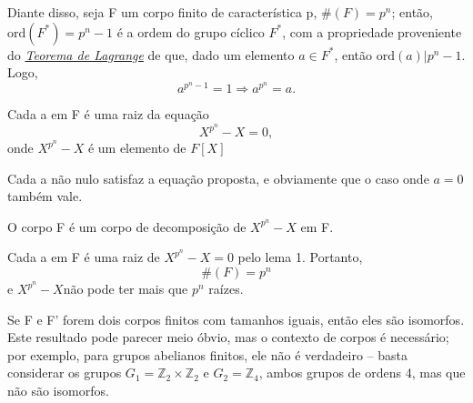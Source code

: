 \documentclass[../algebraIII_notes.tex]{subfiles}
\begin{document}
Diante disso, seja F um corpo finito de característica p, \(\# (F)=p^{n}\); então, \(\mathrm{ord}(F^{*})=p^{n}-1\) é a ordem do grupo cíclico \(F^{*}\), com a propriedade proveniente do \hyperlink{lagrange_theorem}{\textit{Teorema de Lagrange}} de que, dado um elemento \(a\in F^{*}\), então \(\mathrm{ord}(a)| p^{n}-1\). Logo,
\[
	a^{p^{n}-1}=1 \Rightarrow a^{p^{n}}=a.
\]
\begin{lemma*}
	Cada a em F é uma raiz da equação
	\[
		X^{p^{n}}-X =0,
	\]
	onde \(X^{p^{n}}-X\) é um elemento de \(F[X]\)
\end{lemma*}
\begin{proof*}
	Cada a não nulo satisfaz a equação proposta, e obviamente que o caso onde \(a=0\) também vale. \qedsymbol
\end{proof*}
\begin{crl*}
	O corpo F é um corpo de decomposição de \(X^{p^{n}}-X\) em F.
\end{crl*}
\begin{proof*}
	Cada a em F é uma raiz de \(X^{p^{n}}-X=0\) pelo lema 1. Portanto,
	\[
		\#(F)=p^{n}
	\]
	e \(X^{p^{n}}-X\)não pode ter mais que \(p^{n}\) raízes. \qedsymbol
\end{proof*}

\begin{tcolorbox}[
		skin=enhanced,
		title=Observação,
		fonttitle=\bfseries,
		colframe=black,
		colbacktitle=cyan!75!white,
		colback=cyan!15,
		colbacklower=black,
		coltitle=black,
		drop fuzzy shadow,
	]
	Se F e F' forem dois corpos finitos com tamanhos iguais, então eles são isomorfos. Este resultado pode parecer meio óbvio, mas o contexto de corpos é necessário; por exemplo, para grupos abelianos finitos, ele não é verdadeiro -- basta considerar os grupos \(G_1=\mathbb{Z}_2 \times \mathbb{Z}_2\) e \(G_{2} = \mathbb{Z}_4\), ambos grupos de ordens 4, mas que não são isomorfos.
\end{tcolorbox}
\end{document}
